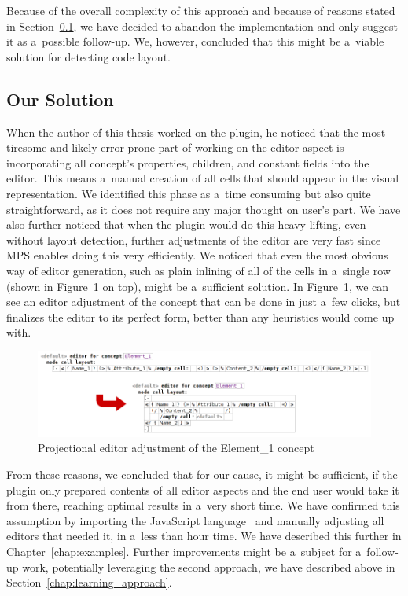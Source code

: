 Because of the overall complexity of this approach and because of reasons stated in Section~\ref{chap:editor_solution}, we have decided to abandon the implementation and only suggest it as a~possible follow-up.
We, however, concluded that this might be a~viable solution for detecting code layout.

\subsection{Our Solution}
\label{chap:editor_solution}

When the author of this thesis worked on the plugin, he noticed that the most tiresome and likely error-prone part of working on the editor aspect is incorporating all concept's properties, children, and constant fields into the editor.
This means a~manual creation of all cells that should appear in the visual representation.
We identified this phase as a~time consuming but also quite straightforward, as it does not require any major thought on user's part.
We have also further noticed that when the plugin would do this heavy lifting, even without layout detection, further adjustments of the editor are very fast since MPS enables doing this very efficiently.
We noticed that even the most obvious way of editor generation, such as plain inlining of all of the cells in a~single row (shown in Figure~\ref{fig:editor_adjustment} on top), might be a~sufficient solution.
In Figure~\ref{fig:editor_adjustment}, we can see an editor adjustment of the  concept that can be done in just a~few clicks, but finalizes the editor to its perfect form, better than any heuristics would come up with.
\\

\begin{figure}[ht]
	\centering
	\includegraphics[width=\textwidth]{./img/editor_adjustment.png}
	\caption{Projectional editor adjustment of the Element{\_}1 concept}
	\label{fig:editor_adjustment}
\end{figure}

From these reasons, we concluded that for our cause, it might be sufficient, if the plugin only prepared contents of all editor aspects and the end user would take it from there, reaching optimal results in a~very short time.
We have confirmed this assumption by importing the JavaScript language~\cite{javascript} and manually adjusting all editors that needed it, in a~less than hour time.
We have described this further in Chapter~\ref{chap:examples}.
Further improvements might be a~subject for a~follow-up work, potentially leveraging the second approach, we have described above in Section~\ref{chap:learning_approach}.

